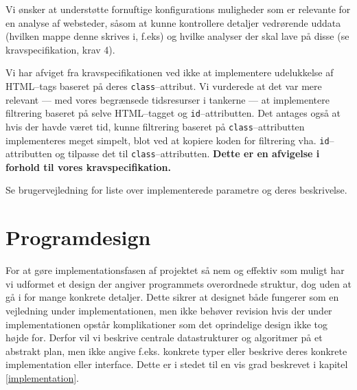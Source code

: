 \documentclass[a4paper,oneside]{memoir}
\begin{document}
Vi ønsker at understøtte fornuftige konfigurations muligheder som er
relevante for en analyse af websteder, såsom at kunne kontrollere
detaljer vedrørende uddata (hvilken mappe denne skrives i, f.eks) og
hvilke analyser der skal lave på disse (se kravspecifikation, krav 4).

Vi har afviget fra kravspecifikationen ved ikke at implementere
udelukkelse af HTML--tags baseret på deres
\texttt{class}--attribut. Vi vurderede at det var mere relevant ---
med vores begrænsede tidsresurser i tankerne --- at implementere
filtrering baseret på selve HTML--tagget og
\texttt{id}--attributten. Det antages også at hvis der havde været
tid, kunne filtrering baseret på \texttt{class}--attributten
implementeres meget simpelt, blot ved at kopiere koden for filtrering
vha. \texttt{id}--attributten og tilpasse det til
\texttt{class}--attributten. \textbf{Dette er en afvigelse i forhold
  til vores kravspecifikation.}

Se brugervejledning for liste over implementerede parametre og deres
beskrivelse.

\chapter{Programdesign}

For at gøre implementationsfasen af projektet så nem og effektiv som
muligt har vi udformet et design der angiver programmets overordnede
struktur, dog uden at gå i for mange konkrete detaljer. Dette sikrer
at designet både fungerer som en vejledning under implementationen,
men ikke behøver revision hvis der under implementationen opstår
komplikationer som det oprindelige design ikke tog højde for. Derfor
vil vi beskrive centrale datastrukturer og algoritmer på et abstrakt
plan, men ikke angive f.eks. konkrete typer eller beskrive deres
konkrete implementation eller interface. Dette er i stedet til en vis
grad beskrevet i kapitel \ref{implementation}.
\end{document}
